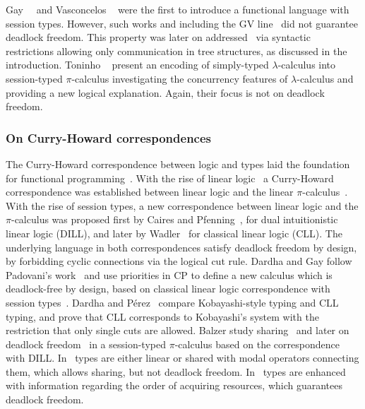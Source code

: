\documentclass[main.tex]{subfiles}
\begin{document}
Gay~\etal~\cite{gaynagarajan03} and Vasconcelos \etal~\cite{vasconcelosravara04,vasconcelosgay06} were the first to introduce a functional language with session types. However, such works and including the GV line~\cite{gayvasconcelos10,gayvasconcelos12} did not guarantee deadlock freedom. This property was later on addressed~\cite{lindleymorris15,wadler15} via syntactic restrictions allowing only communication in tree structures, as discussed in the introduction. Toninho \etal~\cite{toninhocaires12} present an encoding of simply-typed $\lambda$-calculus into session-typed $\pi$-calculus investigating the concurrency features of $\lambda$-calculus and providing a new logical explanation. Again, their focus is not on deadlock freedom.


\subsubsection*{On Curry-Howard correspondences}
The Curry-Howard correspondence between logic and types laid the foundation for functional programming~\cite{wadler15}. With the rise of linear logic~\cite{girard87} a Curry-Howard correspondence was established between linear logic and the linear $\pi$-calculus~\cite{abramsky94,bellinscott94}. With the rise of session types, a new correspondence between linear logic and the $\pi$-calculus was proposed first by Caires and Pfenning~\cite{cairespfenning10}, for dual intuitionistic linear logic (DILL), and later by Wadler~\cite{wadler15} for classical linear logic (CLL). The underlying language in both correspondences satisfy deadlock freedom by design, by forbidding cyclic connections via the logical cut rule. Dardha and Gay follow Padovani's work~\cite{padovani14} and use priorities in CP to define a new calculus which is deadlock-free by design, based on classical linear logic correspondence with session types~\cite{wadler12}. Dardha and P\'{e}rez~\cite{dardhaperez15} compare Kobayashi-style typing and CLL typing, and prove that CLL corresponds to Kobayashi's system with the restriction that only single cuts are allowed. Balzer \etal study sharing~\cite{balzerpfenning17} and later on deadlock freedom~\cite{balzertoninho19} in a session-typed $\pi$-calculus based on the correspondence with DILL. In~\cite{balzerpfenning17} types are either linear or shared with modal operators connecting them, which allows sharing, but not deadlock freedom. In~\cite{balzertoninho19} types are enhanced with information regarding the order of acquiring resources, which guarantees deadlock freedom.
\end{document}
